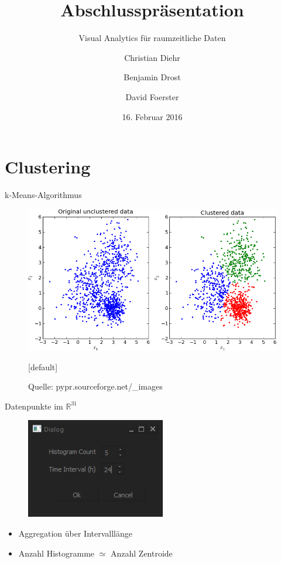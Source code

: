 \documentclass{beamer}
\title{Abschlusspräsentation}
\subtitle{Visual Analytics für raumzeitliche Daten}
\author{Christian Diehr \and Benjamin Drost \and David Foerster}
\institute{Institut für Informatik\\Humboldt-Universität zu Berlin}
\date{16. Februar 2016}
\begin{document}
    \begin{frame}
        \titlepage
    \end{frame}
    \logo %
        
    \section{Clustering}
    \begin{frame}{k-Means-Algorithmus}
		\begin{figure}
			\centering\includegraphics[width=.7\textwidth]{kmeans.png}
			\caption{Quelle: pypr.sourceforge.net/\_images}
		\end{figure}
    \end{frame}
    
    \begin{frame}{Datenpunkte im $\mathds{R}^{31}$}
    	\begin{figure}
    		\centering\includegraphics[width=.4\textwidth]{dialog.png}
    	\end{figure}
    	\begin{itemize}
    		\setlength\itemsep{1em}
    		\item Aggregation über Intervalllänge
    		\item Anzahl Histogramme $\simeq$ Anzahl Zentroide
    	\end{itemize}
    \end{frame}
    
\end{document}
